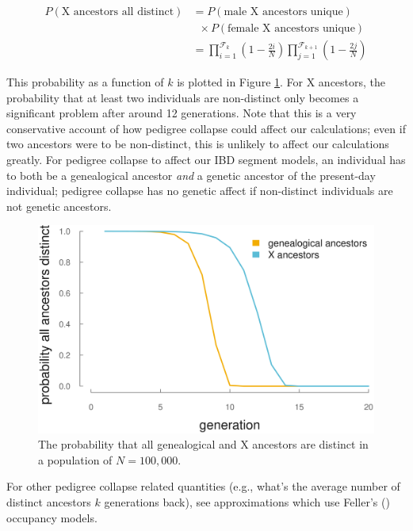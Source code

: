 \documentclass[9pt,twocolumn,twoside]{gsajnl}
\begin{document}
\begin{align*}
  P(\text{X ancestors all distinct}) &= P(\text{male X ancestors unique})   \nonumber\\
  & \;\; \times P(\text{female X ancestors unique}) \nonumber\\
                                     &= \prod_{i=1}^{\mathcal{F}_{k}} \left(1-\frac{2i}{N}\right)\prod_{j=1}^{\mathcal{F}_{k+1}} \left(1-\frac{2j}{N}\right)
\end{align*}

This probability as a function of $k$ is plotted in Figure
\ref{fig:ped-collapse}. For X ancestors, the probability that at least two
individuals are non-distinct only becomes a significant problem after around 12
generations. Note that this is a very conservative account of how pedigree
collapse could affect our calculations; even if two ancestors were to be
non-distinct, this is unlikely to affect our calculations greatly. For pedigree
collapse to affect our IBD segment models, an individual has to both be a
genealogical ancestor \emph{and} a genetic ancestor of the present-day
individual; pedigree collapse has no genetic affect if non-distinct individuals
are not genetic ancestors.

\begin{figure}[!ht]
  \centering
  \includegraphics[width=\linewidth]{images/ped-collapse}
  \caption{The probability that all genealogical and X ancestors are distinct in a population of $N=100,000$.}
  \label{fig:ped-collapse}
\end{figure}

For other pedigree collapse related quantities (e.g., what's the average number
of distinct ancestors $k$ generations back), see
\citet{wachter2013statistical} approximations which use Feller's
(\citeyear{feller1950introduction}) occupancy models.
\end{document}
